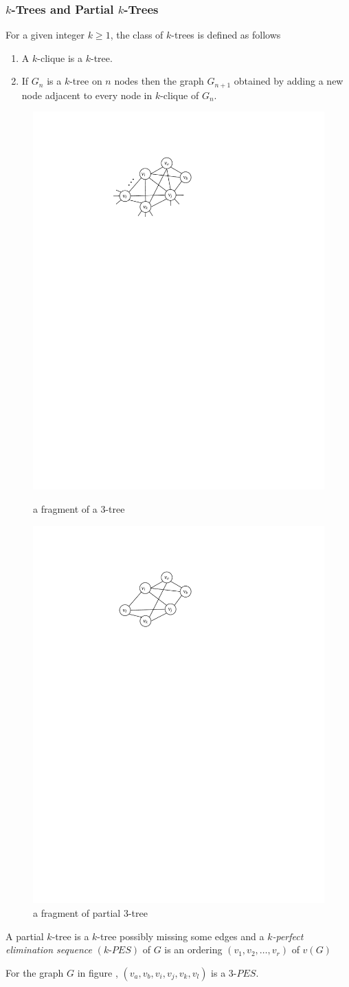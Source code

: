 \documentclass{beamer}
\begin{document}
\begin{frame}
\frametitle{$k$-Trees and Partial $k$-Trees}
\vspace{-0.7em}
\begin{definition} For a given integer $k\geq 1$, the class of $k$-trees is defined as follows
\begin{enumerate}
\item A $k$-clique is a $k$-tree.
\item If $G_n$ is a $k$-tree on $n$ nodes then the graph $G_{n+1}$ obtained by adding a new node adjacent to every node in $k$-clique of $G_n$. 
\end{enumerate}
\end{definition}
\vspace{-1em}
\begin{figure}[!htb]
\begin{minipage}[]{0.4\linewidth}
\includegraphics[width=1 in, height=.8 in]{Ch3f2.pdf}
\vspace{-1em}
 \caption{a fragment of a 3-tree}
 \label{fig:f3t1}
 \end{minipage}
 \begin{minipage}{0.45\linewidth}
 \includegraphics[width=1 in, height=0.8 in]{Ch2f2.pdf}
  \vspace{-1em}
 \caption{a fragment of partial 3-tree}
 \label{fig:f3t2}
 \end{minipage}
\end{figure}
\vspace{-1em}
A partial $k$-tree is a $k$-tree possibly missing some edges
and a \textit{$k$-perfect elimination sequence} $(k\mbox{-}PES)$ of  $G$ is an ordering $(v_1,v_2,\ldots,v_r)$ of $v(G)$
\vspace{-0.5em}
\begin{example}
\normalfont 
For the graph $G$ in figure , $(v_a,v_b,v_i,v_j,v_k,v_l)$ is a 3-$PES$. 
\end{example}
\end{frame}
\end{document}
